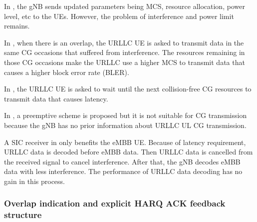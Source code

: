 \documentclass{ieeeaccess}
\begin{document}
In \cite{ref15}, the gNB sends updated parameters being MCS, resource allocation, power level, etc to the UEs. However, the problem of interference and power limit remains.

In \cite{ref16}, when there is an overlap, the URLLC UE is asked to transmit data in the same CG occasions that suffered from interference. The resources remaining in those CG occasions make the URLLC use a higher MCS to transmit data that causes a higher block error rate (BLER).

In \cite{ref17}, the URLLC UE is asked to wait until the next collision-free CG resources to transmit data that causes latency.

In \cite{ref18}, a preemptive scheme is proposed but it is not suitable for CG transmission because the gNB has no prior information about URLLC UL CG transmission.

A SIC receiver in \cite{ref19} only benefits the eMBB UE. Because of latency requirement, URLLC data is decoded before eMBB data. Then URLLC data is cancelled from the received signal to cancel interference. After that, the gNB decodes eMBB data with less interference. The performance of URLLC data decoding has no gain in this process.

\subsubsection{Overlap indication and explicit HARQ ACK feedback structure}\label{IIB2}
\end{document}
